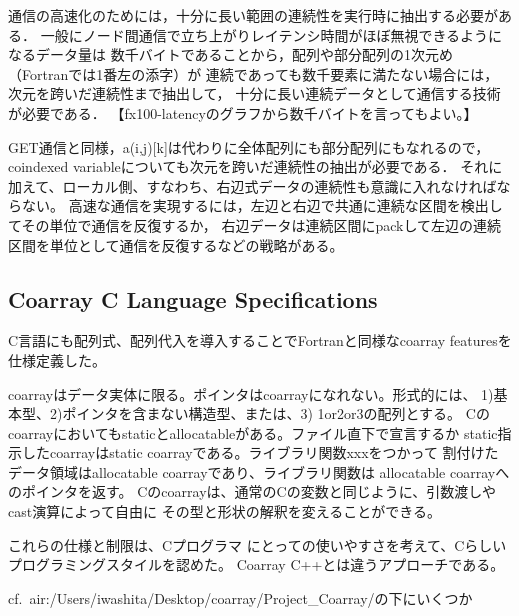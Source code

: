 \requirement
通信の高速化のためには，十分に長い範囲の連続性を実行時に抽出する必要がある．
一般にノード間通信で立ち上がりレイテンシ時間がほぼ無視できるようになるデータ量は
数千バイトであることから，配列や部分配列の1次元め（Fortranでは1番左の添字）が
連続であっても数千要素に満たない場合には，次元を跨いだ連続性まで抽出して，
十分に長い連続データとして通信する技術が必要である．
【fx100-latencyのグラフから数千バイトを言ってもよい。】

GET通信と同様，a(i,j)[k]は代わりに全体配列にも部分配列にもなれるので，
coindexed variableについても次元を跨いだ連続性の抽出が必要である．
それに加えて、ローカル側、すなわち、右辺式データの連続性も意識に入れなければならない。
高速な通信を実現するには，左辺と右辺で共通に連続な区間を検出してその単位で通信を反復するか，
右辺データは連続区間にpackして左辺の連続区間を単位として通信を反復するなどの戦略がある。



\subsection{Coarray C Language Specifications}\label{sec:spec-c}

C言語にも配列式、配列代入を導入することでFortranと同様なcoarray featuresを仕様定義した。

coarrayはデータ実体に限る。ポインタはcoarrayになれない。形式的には、
1)基本型、2)ポインタを含まない構造型、または、3) 1or2or3の配列とする。
Cのcoarrayにおいてもstaticとallocatableがある。ファイル直下で宣言するか
static指示したcoarrayはstatic coarrayである。ライブラリ関数xxxをつかって
割付けたデータ領域はallocatable coarrayであり、ライブラリ関数は
allocatable coarrayへのポインタを返す。
Cのcoarrayは、通常のCの変数と同じように、引数渡しやcast演算によって自由に
その型と形状の解釈を変えることができる。

これらの仕様と制限は、Cプログラマ
にとっての使いやすさを考えて、Cらしいプログラミングスタイルを認めた。
Coarray C++とは違うアプローチである。

cf.\ air:/Users/iwashita/Desktop/coarray/Project\_Coarray/の下にいくつか

